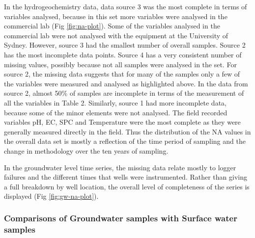 \documentclass[, manuscript]{copernicus}
\begin{document}
In the hydrogeochemistry data, data source 3 was the most complete in
terms of variables analysed, because in this set more variables were
analysed in the commercial lab (Fig \ref{fig:na-plot}). Some of the
variables analysed in the commercial lab were not analysed with the
equipment at the University of Sydney. However, source 3 had the
smallest number of overall samples. Source 2 has the most incomplete
data points. Source 4 has a very consistent number of missing values,
possibly because not all samples were analysed in the set. For source 2,
the missing data suggests that for many of the samples only a few of the
variables were measured and analysed as highlighted above. In the data
from source 2, almost 50\% of samples are incomplete in terms of the
measurement of all the variables in Table 2. Similarly, source 1 had
more incomplete data, because some of the minor elements were not
analysed. The field recorded variables pH, EC, SPC and Temperature were
the most complete as they were generally measured directly in the field.
Thus the distribution of the NA values in the overall data set is mostly
a reflection of the time period of sampling and the change in
methodology over the ten years of sampling.

In the groundwater level time series, the missing data relate mostly to
logger failures and the different times that wells were instrumented.
Rather than giving a full breakdown by well location, the overall level
of completeness of the series is displayed (Fig \ref{fig:gw-na-plot}).

\subsubsection{Comparisons of Groundwater samples with Surface water
samples}

\clearpage
\end{document}
